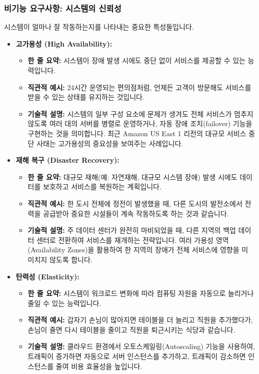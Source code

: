 \documentclass[11pt,a4paper]{article}
\begin{document}
\subsubsection*{비기능 요구사항: 시스템의 신뢰성}
시스템이 얼마나 잘 작동하는지를 나타내는 중요한 특성들입니다.
\begin{itemize}
    \item \textbf{고가용성 (High Availability):}
    \begin{itemize}
        \item \textbf{한 줄 요약:} 시스템이 장애 발생 시에도 중단 없이 서비스를 제공할 수 있는 능력입니다.
        \item \textbf{직관적 예시:} 24시간 운영되는 편의점처럼, 언제든 고객이 방문해도 서비스를 받을 수 있는 상태를 유지하는 것입니다.
        \item \textbf{기술적 설명:} 시스템의 일부 구성 요소에 문제가 생겨도 전체 서비스가 멈추지 않도록 여러 대의 서버를 병렬로 운영하거나, 자동 장애 조치(failover) 기능을 구현하는 것을 의미합니다. 최근 Amazon US East 1 리전의 대규모 서비스 중단 사태는 고가용성의 중요성을 보여주는 사례입니다.
    \end{itemize}
    \item \textbf{재해 복구 (Disaster Recovery):}
    \begin{itemize}
        \item \textbf{한 줄 요약:} 대규모 재해(예: 자연재해, 대규모 시스템 장애) 발생 시에도 데이터를 보호하고 서비스를 복원하는 계획입니다.
        \item \textbf{직관적 예시:} 한 도시 전체에 정전이 발생했을 때, 다른 도시의 발전소에서 전력을 공급받아 중요한 시설들이 계속 작동하도록 하는 것과 같습니다.
        \item \textbf{기술적 설명:} 주 데이터 센터가 완전히 마비되었을 때, 다른 지역의 백업 데이터 센터로 전환하여 서비스를 재개하는 전략입니다. 여러 가용성 영역(Availability Zones)을 활용하여 한 지역의 장애가 전체 서비스에 영향을 미 미치지 않도록 합니다.
    \end{itemize}
    \item \textbf{탄력성 (Elasticity):}
    \begin{itemize}
        \item \textbf{한 줄 요약:} 시스템이 워크로드 변화에 따라 컴퓨팅 자원을 자동으로 늘리거나 줄일 수 있는 능력입니다.
        \item \textbf{직관적 예시:} 갑자기 손님이 많아지면 테이블을 더 늘리고 직원을 추가했다가, 손님이 줄면 다시 테이블을 줄이고 직원을 퇴근시키는 식당과 같습니다.
        \item \textbf{기술적 설명:} 클라우드 환경에서 오토스케일링(Autoscaling) 기능을 사용하여, 트래픽이 증가하면 자동으로 서버 인스턴스를 추가하고, 트래픽이 감소하면 인스턴스를 줄여 비용 효율성을 높입니다.
    \end{itemize}
\end{itemize}
\end{document}

